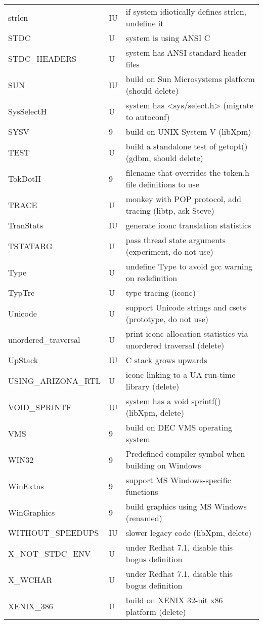 \begin{xtabular}{|m{1.8in}|m{0.5in}|m{4.0in}|}
strlen & IU & if system idiotically defines strlen, undefine it \\
STDC & U & system is using ANSI C \\
STDC\_HEADERS & U & system has ANSI standard header files \\
SUN & IU & build on Sun Microsystems platform (should delete) \\
SysSelectH & U & system has <sys/select.h> (migrate to autoconf) \\
SYSV & 9 & build on UNIX System V (libXpm) \\
TEST & U & build a standalone test of getopt() (gdbm, should delete) \\
TokDotH & 9 & filename that overrides the token.h file definitions to use \\
TRACE & U & monkey with POP protocol, add tracing (libtp, ask Steve) \\
TranStats & IU & generate iconc translation statistics \\
TSTATARG & U & pass thread state arguments (experiment, do not use) \\
Type & U & undefine Type to avoid gcc warning on redefinition \\
TypTrc & U & type tracing (iconc) \\
Unicode & U & support Unicode strings and csets (prototype, do not use) \\
unordered\_traversal & U & print iconc allocation statistics via unordered traversal (delete) \\
UpStack & IU & C stack grows upwards \\
USING\_ARIZONA\_RTL & U & iconc linking to a UA run-time library (delete) \\
VOID\_SPRINTF & IU & system has a void sprintf() (libXpm, delete) \\
VMS & 9 & build on DEC VMS operating system \\
WIN32 & 9 & Predefined compiler symbol when building  on Windows \\
WinExtns & 9 & support MS Windows-specific functions \\
WinGraphics & 9 & build graphics using MS Windows (renamed) \\
WITHOUT\_SPEEDUPS & IU & slower legacy code (libXpm, delete) \\
X\_NOT\_STDC\_ENV & U & under Redhat 7.1, disable this bogus definition \\
X\_WCHAR & U & under Redhat 7.1, disable this bogus definition \\
XENIX\_386 & U & build on XENIX 32-bit x86 platform (delete) \\

\end{xtabular}
